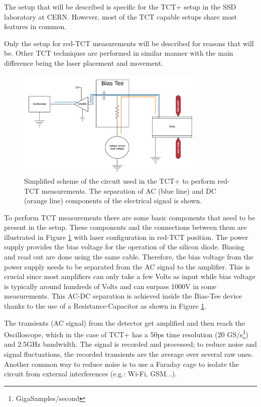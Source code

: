 The setup that will be described is specific for the TCT+ setup in the SSD laboratory at CERN. However, most of the TCT capable setups share most features in common.

Only the setup for red-TCT measurements will be described for reasons that will be. Other TCT techniques are performed in similar manner with the main difference being the laser placement and movement.


\begin{figure}[H]
	\centering
	\includegraphics[width=0.8\textwidth]{Circuit_rTCT.png}
	\caption{Simplified scheme of the circuit used in the TCT+ to perform red-TCT measurements. The separation of AC (blue line) and DC (orange line) components of the electrical signal is shown.}
	\label{fig:circuit}
\end{figure}

To perform TCT measurements there are some basic components that need to be present in the setup. These components and the connections between them are illustrated in Figure \ref{fig:circuit} with laser configuration in red-TCT position. The power supply provides the bias voltage for the operation of the silicon diode. Biasing and read out are done using the same cable. Therefore, the bias voltage from the power supply needs to be separated from the AC signal to the amplifier. This is crucial since most amplifiers can only take a few Volts as input while bias voltage is typically around hundreds of Volts and can surpass 1000V in some measurements. This AC-DC separation is achieved inside the Bias-Tee device thanks to the use of a Resistance-Capacitor as shown in Figure \ref{fig:circuit}.

The transients (AC signal) from the detector get amplified and then reach the Oscilloscope, which in the case of TCT+ has a 50ps time resolution (20 GS/s\footnote{GigaSamples/second}) and 2.5GHz bandwidth. The signal is recorded and processed; to reduce noise and signal fluctuations, the recorded transients are the average over several raw ones. Another common way to reduce noise is to use a Faraday cage to isolate the circuit from external interferences (e.g.: Wi-Fi, GSM...).

